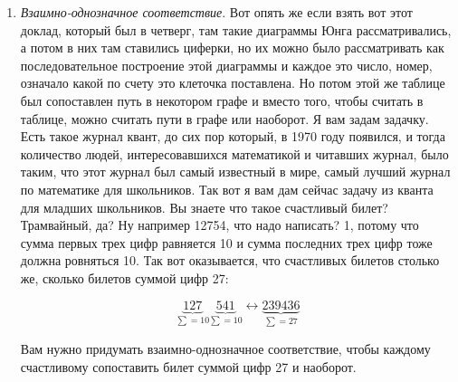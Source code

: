 \documentclass[russian]{lecture-notes}
\theoremstyle{definition}
\newtheorem*{solution}{Решение}
\begin{document}
\begin{enumerate}
\begin{solution}
			 Ну, понятно, что берем $\frac{n}{k}$, а потом от числителя и знаменателя вычитаем по единичке, пока это сохраняет смысл. Поэтому, если вы будете читать Кнута, например, то вы увидите вместо $C_n^k$ вот такое. Мне почему-то приятнее работать с $C_n^k$. Может, потому что я в детстве прочитал Виленкина и на всю жизнь запомнил. Может как-то западное обозначение не похоже на число, да как это скобочки. Да, когда мы видим $C_n^k$, то под ним мы разумеем какое число, а в западном обозначении как бы вот что-то такое непривычное. Но не знаю. Но полезно, конечно, пользоваться любыми обозначениями.
			 
		\end{solution}
	
		Следующая задача связана с самым главным, наверное, приемом в комбинаторике~--- это взаимно-однозначное соответствие.
		
		
		\item \emph{Взаимно-однозначное соответствие}. Вот опять же если взять вот этот доклад, который был в четверг, там такие диаграммы Юнга рассматривались, а потом в них там ставились циферки, но их можно было рассматривать как последовательное построение этой диаграммы и каждое это число, номер, означало какой по счету это клеточка поставлена. Но потом этой же таблице был сопоставлен путь в некотором графе и вместо того, чтобы считать в таблице, можно считать пути в графе или наоборот.  Я вам задам задачку. Есть такое журнал квант, до сих пор который, в 1970 году появился, и тогда количество людей, интересовавшихся математикой и читавших журнал, было таким, что этот журнал был самый известный в мире, самый лучший журнал по математике для школьников. Так вот я вам дам сейчас задачу из кванта для младших школьников. Вы знаете что такое счастливый билет? Трамвайный, да? Ну например 12754, что надо написать? 1, потому что сумма первых трех цифр равняется 10 и сумма последних трех цифр тоже должна ровняться 10. Так вот оказывается, что счастливых билетов столько же, сколько билетов суммой цифр 27:
		
		\[
			\underbrace{127}_{\sum = 10}\underbrace{541}_{\sum = 10} \longleftrightarrow \underbrace{239436}_{\sum = 27}
		\]
		
		
		\begin{problem}
			Вам нужно придумать взаимно-однозначное соответствие, чтобы каждому счастливому сопоставить билет суммой цифр 27 и наоборот.
		\end{problem}
	

\end{enumerate}
\end{document}

